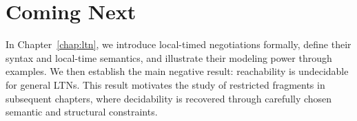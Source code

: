 
\section{Coming Next}

In Chapter~\ref{chap:ltn}, we introduce local-timed negotiations formally, define their
syntax and local-time semantics, and illustrate their modeling power through examples.
We then establish the main negative result: reachability is undecidable for general
LTNs. This result motivates the study of restricted fragments in subsequent chapters,
where decidability is recovered through carefully chosen semantic and structural
constraints.
